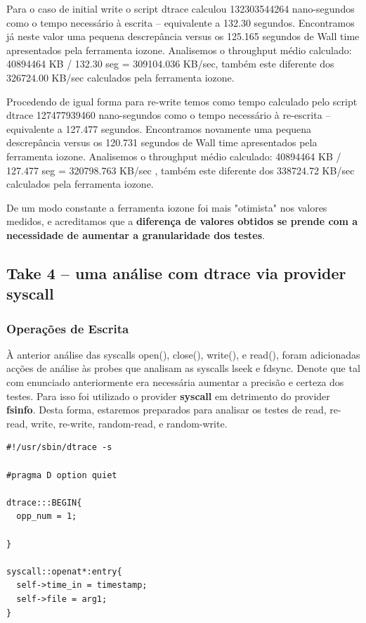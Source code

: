 \documentclass[a4paper]{article}
\begin{document}
{Para o caso de initial write o script dtrace calculou 132303544264 nano-segundos como o tempo necessário à escrita -- equivalente a 132.30 segundos. Encontramos já neste valor uma pequena descrepância versus os 125.165 segundos de Wall time apresentados pela ferramenta iozone. Analisemos o throughput médio calculado: 40894464 KB / 132.30 seg = 309104.036 KB/sec, também este diferente dos 326724.00 KB/sec calculados pela ferramenta iozone. \par 
Procedendo de igual forma para re-write temos como tempo calculado pelo script dtrace 127477939460 nano-segundos como o tempo necessário à re-escrita -- equivalente a 127.477 segundos.  
Encontramos novamente  uma pequena descrepância versus os 120.731 segundos de Wall time apresentados pela ferramenta iozone. Analisemos o throughput médio calculado: 40894464 KB / 127.477 seg = 320798.763 KB/sec , também este diferente dos 338724.72 KB/sec calculados pela ferramenta iozone. \par
De um modo constante a ferramenta iozone foi mais "otimista" nos valores medidos, e acreditamos que a \textbf{diferença de valores obtidos se prende com a necessidade de aumentar a granularidade dos testes}.
\newpage

\subsection{Take 4 -- uma análise com dtrace via provider syscall}
\subsubsection{Operações de Escrita}
À anterior análise das syscalls open(), close(), write(), e read(), foram adicionadas acções de análise às probes que analisam as syscalls lseek e fdsync. Denote que tal com enunciado anteriormente era necessária aumentar a precisão e certeza dos testes. Para isso foi utilizado o provider \textbf{syscall} em detrimento do provider \textbf{fsinfo}.  Desta forma, estaremos preparados para analisar os testes de read, re-read, write, re-write, random-read, e random-write. 

\begin{lstlisting}
#!/usr/sbin/dtrace -s

#pragma D option quiet

dtrace:::BEGIN{
  opp_num = 1;

}

syscall::openat*:entry{
  self->time_in = timestamp;
  self->file = arg1;
}


\end{lstlisting}}
\end{document}
